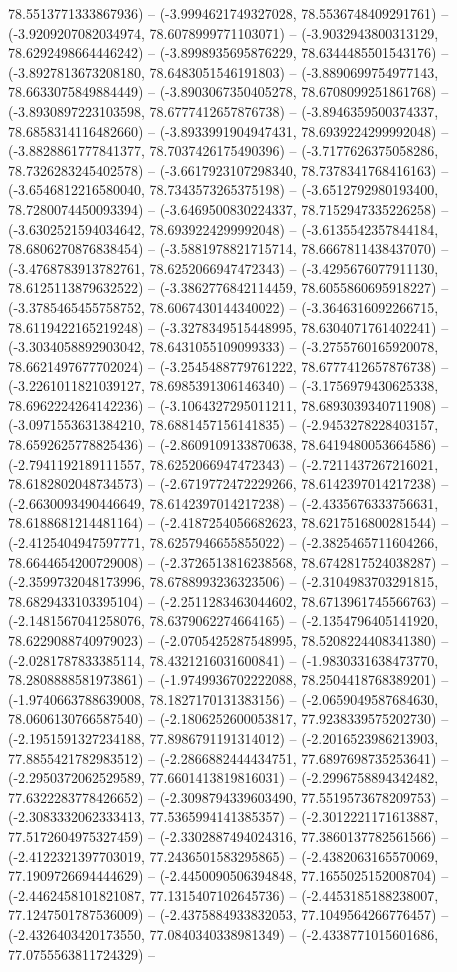 78.5513771333867936) -- (-3.9994621749327028, 78.5536748409291761) -- (-3.9209207082034974, 78.6078999771103071) -- (-3.9032943800313129, 78.6292498664446242) -- (-3.8998935695876229, 78.6344485501543176) -- (-3.8927813673208180, 78.6483051546191803) -- (-3.8890699754977143, 78.6633075849884449) -- (-3.8903067350405278, 78.6708099251861768) -- (-3.8930897223103598, 78.6777412657876738) -- (-3.8946359500374337, 78.6858314116482660) -- (-3.8933991904947431, 78.6939224299992048) -- (-3.8828861777841377, 78.7037426175490396) -- (-3.7177626375058286, 78.7326283245402578) -- (-3.6617923107298340, 78.7378341768416163) -- (-3.6546812216580040, 78.7343573265375198) -- (-3.6512792980193400, 78.7280074450093394) -- (-3.6469500830224337, 78.7152947335226258) -- (-3.6302521594034642, 78.6939224299992048) -- (-3.6135542357844184, 78.6806270876838454) -- (-3.5881978821715714, 78.6667811438437070) -- (-3.4768783913782761, 78.6252066947472343) -- (-3.4295676077911130, 78.6125113879632522) -- (-3.3862776842114459, 78.6055860695918227) -- (-3.3785465455758752, 78.6067430144340022) -- (-3.3646316092266715, 78.6119422165219248) -- (-3.3278349515448995, 78.6304071761402241) -- (-3.3034058892903042, 78.6431055109099333) -- (-3.2755760165920078, 78.6621497677702024) -- (-3.2545488779761222, 78.6777412657876738) -- (-3.2261011821039127, 78.6985391306146340) -- (-3.1756979430625338, 78.6962224264142236) -- (-3.1064327295011211, 78.6893039340711908) -- (-3.0971553631384210, 78.6881457156141835) -- (-2.9453278228403157, 78.6592625778825436) -- (-2.8609109133870638, 78.6419480053664586) -- (-2.7941192189111557, 78.6252066947472343) -- (-2.7211437267216021, 78.6182802048734573) -- (-2.6719772472229266, 78.6142397014217238) -- (-2.6630093490446649, 78.6142397014217238) -- (-2.4335676333756631, 78.6188681214481164) -- (-2.4187254056682623, 78.6217516800281544) -- (-2.4125404947597771, 78.6257946655855022) -- (-2.3825465711604266, 78.6644654200729008) -- (-2.3726513816238568, 78.6742817524038287) -- (-2.3599732048173996, 78.6788993236323506) -- (-2.3104983703291815, 78.6829433103395104) -- (-2.2511283463044602, 78.6713961745566763) -- (-2.1481567041258076, 78.6379062274664165) -- (-2.1354796405141920, 78.6229088740979023) -- (-2.0705425287548995, 78.5208224408341380) -- (-2.0281787833385114, 78.4321216031600841) -- (-1.9830331638473770, 78.2808888581973861) -- (-1.9749936702222088, 78.2504418768389201) -- (-1.9740663788639008, 78.1827170131383156) -- (-2.0659049587684630, 78.0606130766587540) -- (-2.1806252600053817, 77.9238339575202730) -- (-2.1951591327234188, 77.8986791191314012) -- (-2.2016523986213903, 77.8855421782983512) -- (-2.2866882444434751, 77.6897698735253641) -- (-2.2950372062529589, 77.6601413819816031) -- (-2.2996758894342482, 77.6322283778426652) -- (-2.3098794339603490, 77.5519573678209753) -- (-2.3083332062333413, 77.5365994141385357) -- (-2.3012221171613887, 77.5172604975327459) -- (-2.3302887494024316, 77.3860137782561566) -- (-2.4122321397703019, 77.2436501583295865) -- (-2.4382063165570069, 77.1909726694444629) -- (-2.4450090506394848, 77.1655025152008704) -- (-2.4462458101821087, 77.1315407102645736) -- (-2.4453185188238007, 77.1247501787536009) -- (-2.4375884933832053, 77.1049564266776457) -- (-2.4326403420173550, 77.0840340338981349) -- (-2.4338771015601686, 77.0755563811724329) -- 